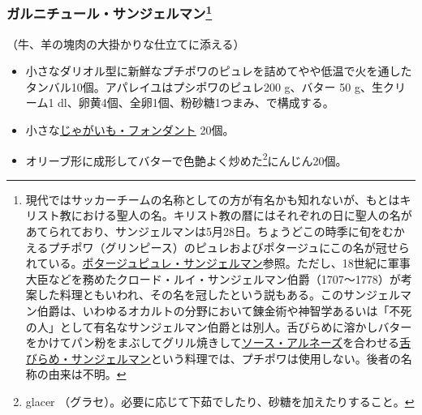 \begin{recette}
\atoaki{}

\hypertarget{garniture-saint-germain}{%
\subsubsection[ガルニチュール・サンジェルマン]{\texorpdfstring{ガルニチュール・サンジェルマン\footnote{現代ではサッカーチームの名称としての方が有名かも知れないが、もとはキリスト教における聖人の名。キリスト教の暦にはそれぞれの日に聖人の名があてられており、サンジェルマンは5月28日。ちょうどこの時季に旬をむかえるプチポワ（グリンピース）のピュレおよびポタージュにこの名が冠せられている。\protect\hyperlink{puree-saint-germain}{ポタージュピュレ・サンジェルマン}参照。ただし、18世紀に軍事大臣などを務めたクロード・ルイ・サンジェルマン伯爵（1707〜1778）が考案した料理ともいわれ、その名を冠したという説もある。このサンジェルマン伯爵は、いわゆるオカルトの分野において錬金術や神智学あるいは「不死の人」として有名なサンジェルマン伯爵とは別人。舌びらめに溶かしバターをかけてパン粉をまぶしてグリル焼きして\protect\hyperlink{sauce-bearnaise}{ソース・アルネーズ}を合わせる\protect\hyperlink{sole-saint-germain}{舌びらめ・サンジェルマン}という料理では、プチポワは使用しない。後者の名称の由来は不明。}}{ガルニチュール・サンジェルマン}}\label{garniture-saint-germain}}



（牛、羊の塊肉の大掛かりな仕立てに添える）

\begin{itemize}
\item
  小さなダリオル型に新鮮なプチポワのピュレを詰めてやや低温で火を通したタンバル10個。アパレイユはプシポワのピュレ200
  g、バター 50 g、生クリーム1
  dl、卵黄4個、全卵1個、粉砂糖1つまみ、で構成する。
\item
  小さな\protect\hyperlink{pommes-de-terreux5cux2520fondantes}{じゃがいも・フォンダント}
  20個。
\item
  オリーブ形に成形してバターで色艶よく炒めた\footnote{glacer
    （グラセ）。必要に応じて下茹でしたり、砂糖を加えたりすること。}にんじん20個。
\end{itemize}

\atoaki{}


\end{recette}
